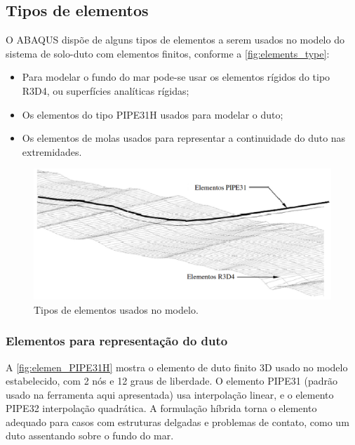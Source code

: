 \subsection{Tipos de elementos}

O ABAQUS dispõe de alguns tipos de elementos a serem usados no modelo do sistema de solo-duto com elementos finitos, conforme a \autoref{fig:elements_type}:

\begin{itemize}
    \item Para modelar o fundo do mar pode-se usar os elementos rígidos do tipo R3D4, ou superfícies analíticas rígidas;
    \item Os elementos do tipo PIPE31H usados para modelar o duto;
    \item Os elementos de molas usados para representar a continuidade do duto nas extremidades.
\end{itemize}

\begin{figure}[!ht]
    \centering
    \caption{Tipos de elementos usados no modelo.}\label{fig:elements_type}
    \includegraphics[width=0.8\linewidth]{imagens/elements_types}
\end{figure}

\subsubsection{Elementos para representação do duto}

A \autoref{fig:elemen_PIPE31H} mostra o elemento de duto finito 3D usado no modelo estabelecido, com 2 nós e 12 graus de liberdade.
O elemento PIPE31 (padrão usado na ferramenta aqui apresentada) usa interpolação linear, e o elemento PIPE32 interpolação quadrática.
A formulação híbrida torna o elemento adequado para casos com estruturas delgadas e problemas de contato, como um duto assentando sobre o fundo do mar.

